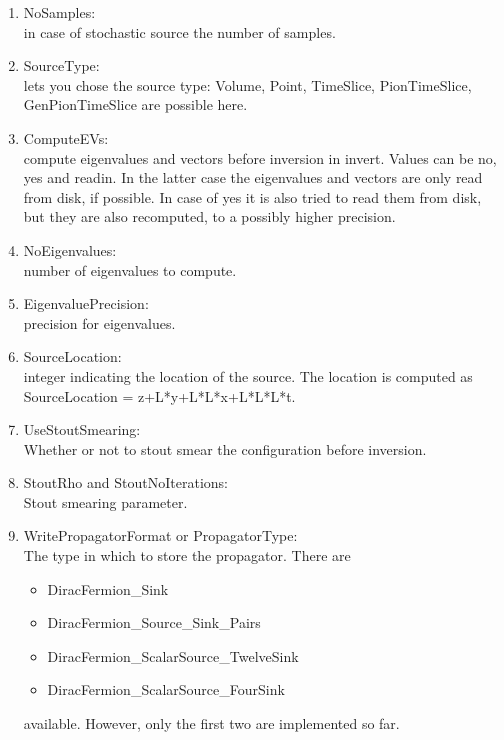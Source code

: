 \begin{enumerate}
\item {\ttfamily NoSamples}:\\
  in case of stochastic source the number of samples.

\item {\ttfamily SourceType}:\\
  lets you chose the source type: {\ttfamily Volume, Point, TimeSlice,
  PionTimeSlice, GenPionTimeSlice}
  are possible here.

\item {\ttfamily ComputeEVs}:\\
  compute eigenvalues and vectors before inversion in invert. Values
  can be no, yes and readin. In the latter case the eigenvalues and
  vectors are only read from disk, if possible. In case of yes it is
  also tried to read them from disk, but they are also recomputed, to
  a possibly higher precision.

\item {\ttfamily NoEigenvalues}:\\
  number of eigenvalues to compute.

\item {\ttfamily EigenvaluePrecision}:\\
  precision for eigenvalues.

\item {\ttfamily SourceLocation}:\\
  integer indicating the location of the source. The location is computed as
  {\ttfamily SourceLocation = z+L*y+L*L*x+L*L*L*t}.

\item {\ttfamily UseStoutSmearing}:\\
  Whether or not to stout smear the configuration before inversion.

\item {\ttfamily StoutRho} and {\ttfamily StoutNoIterations}:\\
  Stout smearing parameter.

\item {\ttfamily WritePropagatorFormat} or {\ttfamily PropagatorType}:\\
  The type in which to store the propagator. There are 
  \begin{itemize}
  \item {\ttfamily DiracFermion\_Sink}
  \item {\ttfamily DiracFermion\_Source\_Sink\_Pairs}
  \item {\ttfamily DiracFermion\_ScalarSource\_TwelveSink}
  \item {\ttfamily DiracFermion\_ScalarSource\_FourSink}
  \end{itemize}
  available. However, only the first two are implemented so far.


\end{enumerate}
